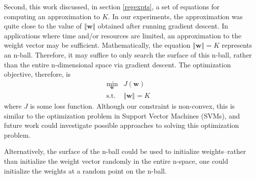 \documentclass{article}
\begin{document}
Second, this work discussed, in section \ref{regexpts}, a set of equations for computing an approximation to $K$. In our experiments, the approximation was quite close to the value of $\left\Vert \textbf{w} \right\Vert$ obtained after running gradient descent. In applications where time and/or resources are limited, an approximation to the weight vector may be sufficient. Mathematically, the equation $\left\Vert \textbf{w} \right\Vert = K$ represents an n-ball. Therefore, it may suffice to only search the surface of this n-ball, rather than the entire n-dimensional space via gradient descent. The optimization objective, therefore, is
\[
    \begin{aligned}
        \min\limits_{\textbf{w}} & J(\textbf{w}) \\
        \text{s.t. } & \left\Vert \textbf{w} \right\Vert = K 
    \end{aligned}
\]
where $J$ is some loss function. Although our constraint is non-convex, this is similar to the optimization problem in Support Vector Machines (SVMs), and future work could investigate possible approaches to solving this optimization problem.

Alternatively, the surface of the n-ball could be used to initialize weights--rather than initialize the weight vector randomly in the entire n-space, one could initialize the weights at a random point on the n-ball.



\end{document}
